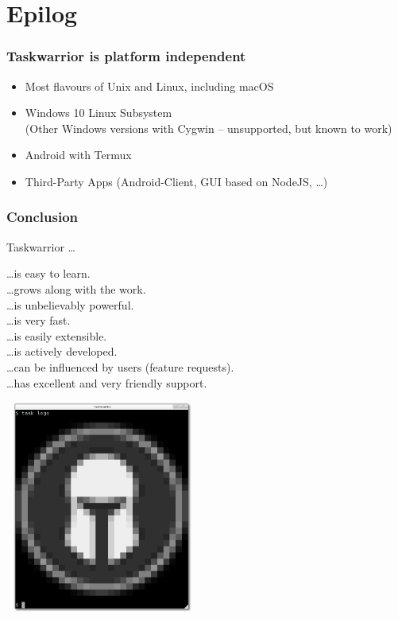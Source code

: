 \documentclass[t,handout,aspectratio=169]{beamer}
\begin{document}
\section{Epilog}

\begin{frame}[fragile]\frametitle{Taskwarrior is platform independent}
    \vfill
    \begin{itemize}
        \item Most flavours of Unix and Linux, including macOS
        \item Windows 10 Linux Subsystem \\
            {\small (Other Windows versions with Cygwin -- unsupported, but known to work)}
        \item Android with Termux
        \item Third-Party Apps (Android-Client, GUI based on NodeJS, \ldots)
    \end{itemize}
\end{frame}

\begin{frame}[fragile]\frametitle{Conclusion}
    \vfill
    Taskwarrior \ldots \pause

    \ldots is easy to learn. \\ \pause
    \ldots grows along with the work. \\ \pause
    \ldots is unbelievably powerful. \\ \pause
    \ldots is very fast. \\ \pause
    \ldots is easily extensible. \\ \pause
    \ldots is actively developed. \\ \pause
    \ldots can be influenced by users (feature requests). \\ \pause
    \ldots has excellent and very friendly support.
\end{frame}

\begin{frame}[fragile]
    \vfill
    \begin{center}
        \includegraphics[width=6.4cm,height=7cm]{task_logo.png}
    \end{center}
\end{frame}
\end{document}
